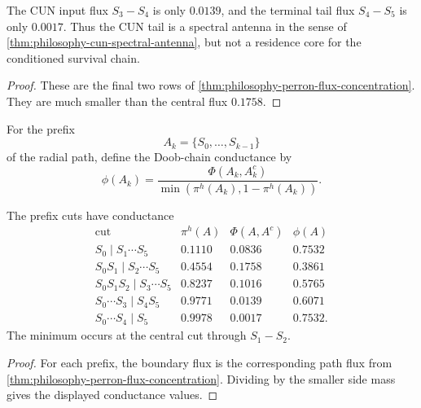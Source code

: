 \begin{corollary}
\label{cor:philosophy-cun-tail-not-residence-core}
The CUN input flux $S_{3}-S_{4}$ is only $0.0139$, and the terminal tail
flux $S_{4}-S_{5}$ is only $0.0017$. Thus the CUN tail is a spectral
antenna in the sense of \autoref{thm:philosophy-cun-spectral-antenna},
but not a residence core for the conditioned survival chain.
\end{corollary}
\begin{proof}
These are the final two rows of
\autoref{thm:philosophy-perron-flux-concentration}. They are much
smaller than the central flux $0.1758$.
\end{proof}

\begin{definition}
\label{def:philosophy-doob-prefix-conductance}
For the prefix
$$
  A_{k}=\{S_{0},\ldots,S_{k-1}\}
$$
of the radial path, define the Doob-chain conductance by
$$
  \phi(A_{k})=
  \frac{\Phi(A_{k},A_{k}^{c})}
       {\min(\pi^{h}(A_{k}),1-\pi^{h}(A_{k}))}.
$$
\end{definition}

\begin{theorem}
\label{thm:philosophy-balanced-central-bottleneck}
The prefix cuts have conductance
$$
\begin{array}{c|r|r|r}
  \text{cut} & \pi^{h}(A) & \Phi(A,A^{c}) & \phi(A)\\
  \hline
  S_{0}\mid S_{1}\cdots S_{5} & 0.1110 & 0.0836 & 0.7532\\
  S_{0}S_{1}\mid S_{2}\cdots S_{5} & 0.4554 & 0.1758 & 0.3861\\
  S_{0}S_{1}S_{2}\mid S_{3}\cdots S_{5} & 0.8237 & 0.1016 & 0.5765\\
  S_{0}\cdots S_{3}\mid S_{4}S_{5} & 0.9771 & 0.0139 & 0.6071\\
  S_{0}\cdots S_{4}\mid S_{5} & 0.9978 & 0.0017 & 0.7532.
\end{array}
$$
The minimum occurs at the central cut through
$S_{1}-S_{2}$.
\end{theorem}
\begin{proof}
For each prefix, the boundary flux is the corresponding path flux from
\autoref{thm:philosophy-perron-flux-concentration}. Dividing by the
smaller side mass gives the displayed conductance values.
\end{proof}

